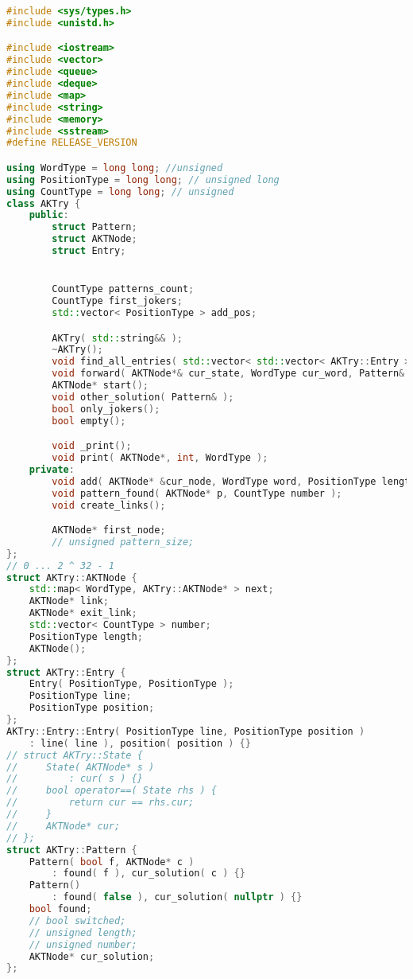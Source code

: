 \begin{lstlisting}[language=C++]
#include <sys/types.h>
#include <unistd.h>

#include <iostream>
#include <vector>
#include <queue>
#include <deque>
#include <map>
#include <string>
#include <memory>
#include <sstream>
#define RELEASE_VERSION

using WordType = long long; //unsigned
using PositionType = long long; // unsigned long
using CountType = long long; // unsigned
class AKTry {
    public:
        struct Pattern;
        struct AKTNode;
        struct Entry;


        CountType patterns_count;
        CountType first_jokers;
        std::vector< PositionType > add_pos;

        AKTry( std::string&& );
        ~AKTry();
        void find_all_entries( std::vector< std::vector< AKTry::Entry > >& );
        void forward( AKTNode*& cur_state, WordType cur_word, Pattern& pattern );
        AKTNode* start();
        void other_solution( Pattern& );
        bool only_jokers();
        bool empty();

        void _print();
        void print( AKTNode*, int, WordType );
    private:
        void add( AKTNode* &cur_node, WordType word, PositionType length );
        void pattern_found( AKTNode* p, CountType number );
        void create_links();

        AKTNode* first_node;
        // unsigned pattern_size;
};
// 0 ... 2 ^ 32 - 1
struct AKTry::AKTNode {
    std::map< WordType, AKTry::AKTNode* > next;
    AKTNode* link;
    AKTNode* exit_link;
    std::vector< CountType > number;
    PositionType length;
    AKTNode();
};
struct AKTry::Entry {
    Entry( PositionType, PositionType );
    PositionType line;
    PositionType position;
};
AKTry::Entry::Entry( PositionType line, PositionType position )
    : line( line ), position( position ) {}
// struct AKTry::State {
//     State( AKTNode* s )
//         : cur( s ) {}
//     bool operator==( State rhs ) {
//         return cur == rhs.cur;
//     }
//     AKTNode* cur;
// };
struct AKTry::Pattern {
    Pattern( bool f, AKTNode* c )
        : found( f ), cur_solution( c ) {}
    Pattern()
        : found( false ), cur_solution( nullptr ) {}
    bool found;
    // bool switched;
    // unsigned length;
    // unsigned number;
    AKTNode* cur_solution;
};


\end{lstlisting}
